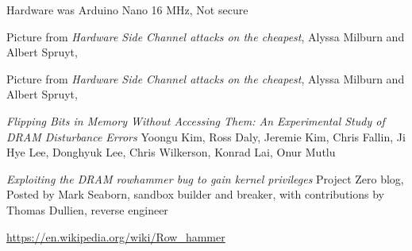 \documentclass[Screen16to9,17pt]{foils}
\begin{document}


Hardware was Arduino Nano 16 MHz, Not secure

Picture from
\emph{Hardware Side Channel attacks on the cheapest}, Alyssa Milburn and Albert Spruyt,



Picture from
\emph{Hardware Side Channel attacks on the cheapest}, Alyssa Milburn and Albert Spruyt,



\emph{Flipping Bits in Memory Without Accessing Them: An Experimental Study of DRAM Disturbance Errors} Yoongu Kim, Ross Daly, Jeremie Kim, Chris Fallin, Ji Hye Lee, Donghyuk Lee, Chris Wilkerson, Konrad Lai, Onur Mutlu

\emph{Exploiting the DRAM rowhammer bug to gain kernel privileges}
Project Zero blog, Posted by Mark Seaborn, sandbox builder and breaker, with contributions by Thomas Dullien, reverse engineer

\url{https://en.wikipedia.org/wiki/Row_hammer}


\slidenext
\end{document}
